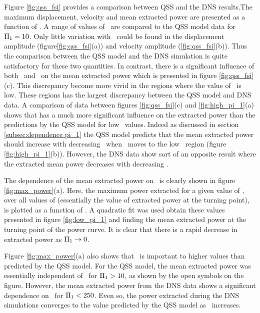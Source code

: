 Figure \ref{fig:qss_fsi} provides a comparison between QSS and the DNS results.The maximum displacement, velocity and mean extracted power are presented as a function of \massdamp. A range of values of \massstiff\ are compared to the QSS model data for $\Pi_1 = 10$. Only little variation with \massstiff \ could be found in  the displacement amplitude (figure\ref{fig:qss_fsi}(a)) and velocity amplitude (\ref{fig:qss_fsi}(b)). Thus the comparison between the QSS model and the DNS simulation is quite satisfactory for these two quantities. In contrast, there is a significant influence of both \massstiff\ and \massdamp\ on the mean extracted power which is  presented in figure \ref{fig:qss_fsi}(c). This discrepancy become more vivid in the regions where the value of \massstiff\ is low. These regions has the largest discrepancy between the QSS model and DNS data. A comparison of data between figures \ref{fig:qss_fsi}(c) and \ref{fig:high_pi_1}(a) shows that \massstiff has a much more significant influence on the extracted power than the predictions by the QSS model for low \massstiff\ values. Indeed as discussed in section \ref{subsec:dependence pi_1} the QSS model predicts that the mean extracted power should increase with decreasing \massstiff\ when \massstiff\ moves to the low \massstiff\ region (figure \ref{fig:high_pi_1}(b)). However, the DNS data show sort of an opposite result where the extracted mean power decreases with decreasing \massstiff.






The dependence of the mean extracted power on \massstiff\ is clearly shown in figure \ref{fig:max_power}(a).  Here, the maximum power extracted for a given value of \massstiff, over all values of \massdamp (essentially the value of extracted power at the turning point), is plotted as a function of \massstiff. A quadratic fit was used obtain these values presented in figure \ref{fig:low_pi_1} and finding the mean extracted power at the turning point of the power curve. It is clear that there is a rapid decrease in extracted power as $\Pi_1 \rightarrow 0$. 







Figure \ref{fig:max_power}(a) also shows that \massstiff\ is important to higher values than predicted by the QSS model. For the QSS model, the mean extracted power was essentially independent of \massstiff\ for $\Pi_1>10$, as shown by the open symbols on the figure. However, the mean extracted power from the DNS data shows a significant dependence on \massstiff\ for $\Pi_1<250$. Even so, the power extracted during the DNS simulations converges to the value predicted by the QSS model as \massstiff\ increases.


